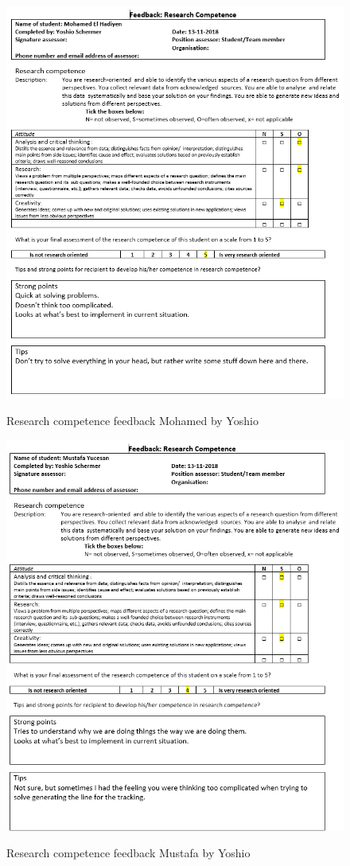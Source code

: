 \documentclass[12pt]{article}
\begin{document}
	\begin{figure}[p!]
		\centering
		\includegraphics[width=\columnwidth]{ResSklMohamed3.PNG}\\
		\caption{Research competence feedback Mohamed by Yoshio}
	\end{figure}
	\begin{figure}[p!]
		\centering
		\includegraphics[width=\columnwidth]{ResSklMustafa3.PNG}\\
		\caption{Research competence feedback Mustafa by Yoshio}
	\end{figure}
\end{document}
